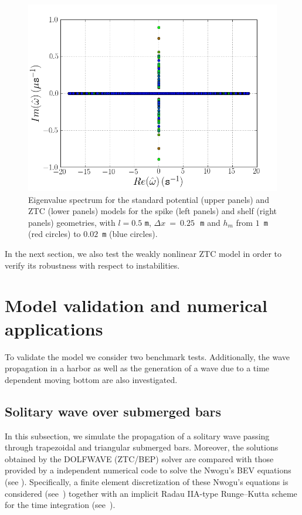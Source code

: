 \begin{figure}
  \includegraphics[width=\twofigs]{chapters/lopes/png/L0_5_dx_0_25_hm_shelf_spectrum_Zhao.png}  \caption{Eigenvalue spectrum for the standard potential (upper
    panels) and ZTC (lower panels) models for the spike (left panels) and
    shelf (right panels) geometries, with $l=0.5$ {\tt m}, $\Delta
    x~=~0.25$\,~{\tt m} and $h_m$ from $1$~{\tt m} (red circles) to
    $0.02$~{\tt m} (blue circles).}
  \label{fig:lopes:spectrumhm3}
\end{figure}

In the next section, we also test the weakly nonlinear ZTC model in
order to verify its robustness with respect to instabilities.


\enlargethispage{8pt}
\section{Model validation and numerical applications}
\label{sec:lopes:numericaltests}

To validate the model we consider two benchmark tests.  Additionally,
the wave propagation in a harbor as well as the generation of a wave
due to a time dependent moving bottom are also investigated.

\subsection{Solitary wave over  submerged bars}

In this subsection, we simulate the propagation of a solitary wave
passing through trapezoidal and triangular submerged bars.  Moreover,
the solutions obtained by the DOLFWAVE (ZTC/BEP) solver are compared
with those provided by a \fenics independent numerical code to solve
the Nwogu's BEV equations (see ).
Specifically, a finite element discretization of these Nwogu's
equations is considered (see~\citet{Walkley1999}) together with an
implicit Radau IIA-type Runge--Kutta scheme for the time integration
(see~\citet{HairerWanner1991b}).

